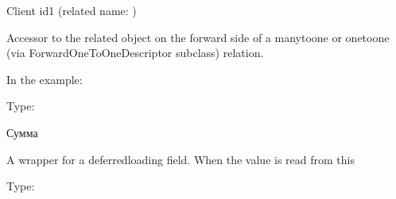 \documentclass[letterpaper,10pt,russian]{sphinxmanual}
\begin{document}
\begin{fulllineitems}
\begin{fulllineitems}
\sphinxAtStartPar
Client id1 (related name: {\hyperref[\detokenize{myapp:polls.models.Client.deposits}]{}})

\sphinxAtStartPar
Accessor to the related object on the forward side of a many\sphinxhyphen{}to\sphinxhyphen{}one or
one\sphinxhyphen{}to\sphinxhyphen{}one (via ForwardOneToOneDescriptor subclass) relation.

\sphinxAtStartPar
In the example:

\begin{sphinxVerbatim}[commandchars=\\\{\}]
       
\end{sphinxVerbatim}

\end{fulllineitems}


\begin{fulllineitems}
\label{\detokenize{myapp:polls.models.Deposit.amount}}
\pysigstartsignatures
\pysigline
{}
\pysigstopsignatures
\sphinxAtStartPar
Type: 

\sphinxAtStartPar
Сумма

\sphinxAtStartPar
A wrapper for a deferred\sphinxhyphen{}loading field. When the value is read from this

\end{fulllineitems}


\begin{fulllineitems}
\label{\detokenize{myapp:polls.models.Deposit.interest_rate}}
\pysigstartsignatures
\pysigline
{}
\pysigstopsignatures
\sphinxAtStartPar
Type: 


\end{fulllineitems}
\end{fulllineitems}
\end{document}
